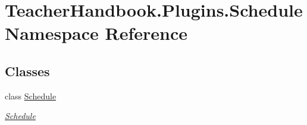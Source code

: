 \hypertarget{namespace_teacher_handbook_1_1_plugins_1_1_schedule}{}\section{Teacher\+Handbook.\+Plugins.\+Schedule Namespace Reference}
\label{namespace_teacher_handbook_1_1_plugins_1_1_schedule}
\subsection*{Classes}
\begin{DoxyCompactItemize}
\item 
class \mbox{\hyperlink{class_teacher_handbook_1_1_plugins_1_1_schedule_1_1_schedule}{Schedule}}
\begin{DoxyCompactList}\small\item\em \mbox{\hyperlink{class_teacher_handbook_1_1_plugins_1_1_schedule_1_1_schedule}{Schedule}} \end{DoxyCompactList}\end{DoxyCompactItemize}
